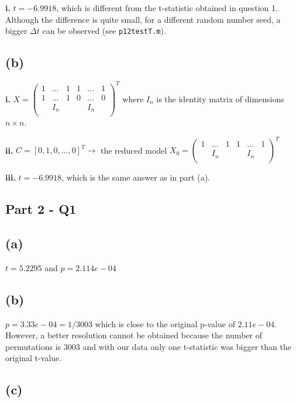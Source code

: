 \documentclass[12pt,a4paper,oneside]{report}
\begin{document}
\textbf{i. } $t = -6.9918$, which is different from the t-statistic obtained in question 1. Although the difference is quite small, for a different random number seed, a bigger $\Delta t$ can be observed (see \texttt{p12testT.m}). 

\subsection*{(b)}

\textbf{i. } $X = \begin{pmatrix}
1 & \dots & 1 & 1 & \dots & 1\\
1 & \dots & 1 & 0 & \dots & 0\\
& I_n & & & I_n &\\
\end{pmatrix}^T$ where $I_n$ is the identity matrix of dimensions $n \times n$.

\textbf{ii. } $C = [0, 1, 0, \dots, 0]^T \to$ the reduced model $X_0 = \begin{pmatrix}
1 & \dots & 1 & 1 & \dots & 1\\
& I_n & & & I_n &\\
\end{pmatrix}^T$

\textbf{iii. }  $t = -6.9918$, which is the same answer as in part (a).

\subsection*{Part 2 - Q1}

\subsection*{(a)}

$t = 5.2295$ and $p=2.114e-04$

\subsection*{(b)}

$p=3.33e-04 = 1/3003$ which is close to the original p-value of $2.11e-04$. However, a better resolution cannot be obtained because the number of permutations is 3003 and with our data only one t-statistic was bigger than the original t-value.

\subsection*{(c)}
\end{document}
